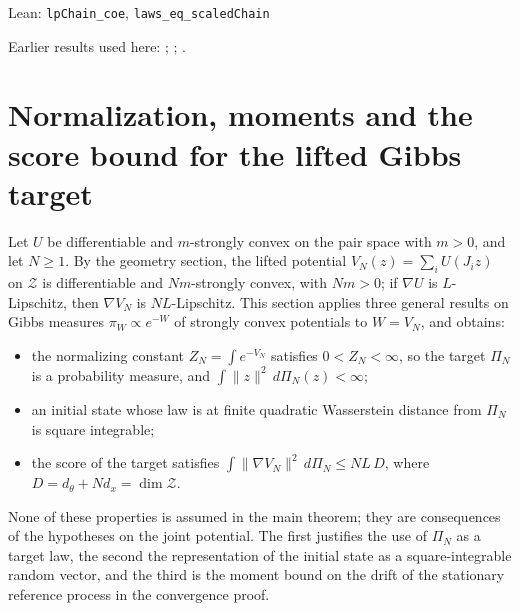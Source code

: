 \documentclass[11pt,a4paper]{report}
\begin{document}
\begin{leanbox}{Lean: \texttt{lpChain\_\allowbreak{}coe}, \texttt{laws\_\allowbreak{}eq\_\allowbreak{}scaledChain}}
\begin{enumerate}
\end{enumerate}
\end{leanbox}


Earlier results used here: \cite[Section~3.13.12]{LangevinLean2026ULASC}; \cite[Section~3.19.1]{LangevinLean2026ULASC}; \cite[Section~3.19.2]{LangevinLean2026ULASC}.
\section{\texorpdfstring{Normalization, moments and the score bound for the lifted Gibbs target}{Normalization, moments and the score bound for the lifted Gibbs target}}
\label{proof-module-IPLA-Foundations-lean}


Let \(U\) be differentiable and \(m\)-strongly convex on the pair space with \(m>0\), and let \(N\ge1\). By the geometry section, the lifted potential \(V_N(z)=\sum_iU(J_iz)\) on \(\mathcal Z\) is differentiable and \(Nm\)-strongly convex, with \(Nm>0\); if \(\nabla U\) is \(L\)-Lipschitz, then \(\nabla V_N\) is \(NL\)-Lipschitz. This section applies three general results on Gibbs measures \(\pi_W\propto e^{-W}\) of strongly convex potentials to \(W=V_N\), and obtains:



\begin{itemize}


\item the normalizing constant \(Z_N=\int e^{-V_N}\) satisfies \(0<Z_N<\infty\), so the target \(\Pi_N\) is a probability measure, and \(\int\|z\|^2\,d\Pi_N(z)<\infty\);

\item an initial state whose law is at finite quadratic Wasserstein distance from \(\Pi_N\) is square integrable;

\item the score of the target satisfies \(\int\|\nabla V_N\|^2\,d\Pi_N\le NL\,D\), where \(D=d_\theta+Nd_x=\dim\mathcal Z\).

\end{itemize}



None of these properties is assumed in the main theorem; they are consequences of the hypotheses on the joint potential. The first justifies the use of \(\Pi_N\) as a target law, the second the representation of the initial state as a square-integrable random vector, and the third is the moment bound on the drift of the stationary reference process in the convergence proof.
\end{document}
